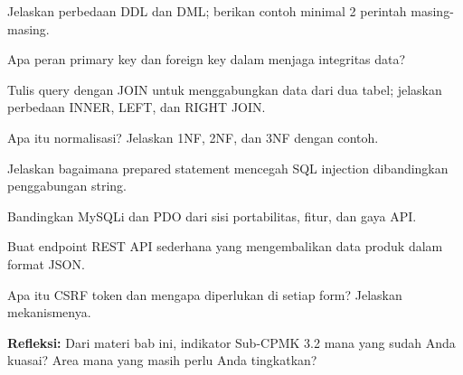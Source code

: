 \documentclass[../main.tex]{subfiles}
\begin{document}
\begin{latihan}
  \item Jelaskan perbedaan DDL dan DML; berikan contoh minimal 2 perintah masing-masing.
  \item Apa peran primary key dan foreign key dalam menjaga integritas data?
  \item Tulis query dengan JOIN untuk menggabungkan data dari dua tabel; jelaskan perbedaan INNER, LEFT, dan RIGHT JOIN.
  \item Apa itu normalisasi? Jelaskan 1NF, 2NF, dan 3NF dengan contoh.
  \item Jelaskan bagaimana prepared statement mencegah SQL injection dibandingkan penggabungan string.
  \item Bandingkan MySQLi dan PDO dari sisi portabilitas, fitur, dan gaya API.
  \item Buat endpoint REST API sederhana yang mengembalikan data produk dalam format JSON.
  \item Apa itu CSRF token dan mengapa diperlukan di setiap form? Jelaskan mekanismenya.
  \item \textbf{Refleksi:} Dari materi bab ini, indikator Sub-CPMK 3.2 mana yang sudah Anda kuasai? Area mana yang masih perlu Anda tingkatkan?
\end{latihan}
\end{document}
